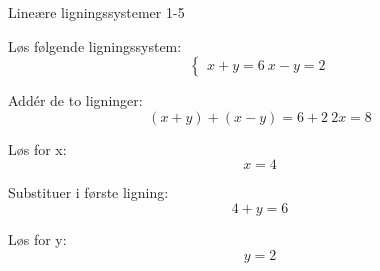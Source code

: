 \documentclass{article}
\begin{document}
\newpage

\begin{exercise}{Lineære ligningssystemer 1-5}

Løs følgende ligningssystem:
\[
\begin{cases}
 x + y = 6 \
 x - y = 2
 \end{cases}
\]


\hint

Addér de to ligninger:
\[
(x + y) + (x - y) = 6 + 2 \ 2x = 8
\]

\hint

Løs for x:
\[
x = 4
\]

\hint

Substituer i første ligning:
\[
4 + y = 6
\]

\hint

Løs for y:
\[
y = 2
\]

\end{exercise}
\end{document}
